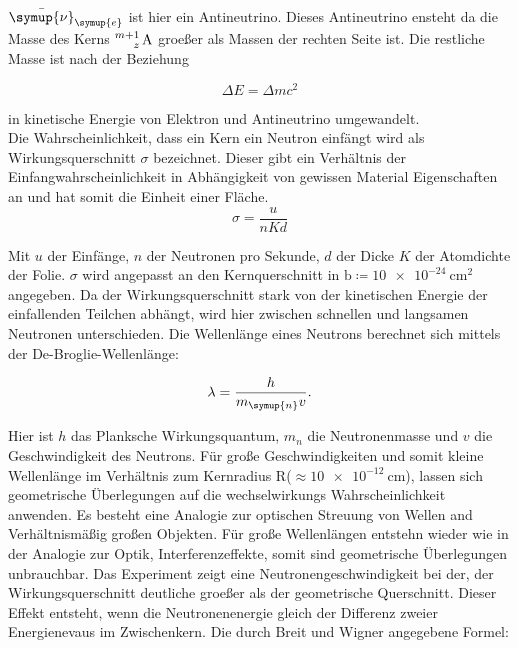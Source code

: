 \noindent $\bar{\symup{\nu}}_{\symup{e}}$ ist hier ein Antineutrino. Dieses Antineutrino ensteht da die Masse des Kerns $\ce{^{m+1}_z \text{A}}$ 
groeßer als Massen der rechten Seite ist. Die restliche Masse ist nach der Beziehung

\begin{equation}
   \Delta E = \Delta m c^2 \nonumber
\end{equation}

\noindent in kinetische Energie von Elektron und Antineutrino umgewandelt.\\
Die Wahrscheinlichkeit, dass ein Kern ein Neutron einfängt wird als Wirkungsquerschnitt $\sigma$ bezeichnet. Dieser gibt ein Verhältnis der 
Einfangwahrscheinlichkeit in Abhängigkeit von gewissen Material Eigenschaften an und hat somit die Einheit einer Fläche.
\begin{equation}
   \sigma = \frac{u}{nKd} \nonumber
\end{equation}

\noindent Mit $u$ der Einfänge, $n$ der Neutronen pro Sekunde, $d$ der Dicke $K$ der Atomdichte der Folie. $\sigma$ wird angepasst an den 
Kernquerschnitt in $\si{\barn} \coloneqq \SI{10e-24}{\centi\metre\squared}$  angegeben. Da der Wirkungsquerschnitt stark von der kinetischen Energie 
der einfallenden Teilchen abhängt, wird hier zwischen schnellen und langsamen Neutronen unterschieden. Die Wellenlänge eines Neutrons 
berechnet sich mittels der De-Broglie-Wellenlänge:

\begin{equation}
   \lambda = \frac{h}{m_{\symup{n}}v}. \nonumber
\end{equation}

\noindent Hier ist $h$ das Planksche Wirkungsquantum, $m_n$ die Neutronenmasse und $v$ die Geschwindigkeit des Neutrons. Für große Geschwindigkeiten 
und somit kleine Wellenlänge im Verhältnis zum Kernradius R($\approx \SI{10e-12}{\centi\meter}$), lassen sich geometrische Überlegungen auf die 
wechselwirkungs Wahrscheinlichkeit anwenden. Es besteht eine Analogie zur optischen Streuung von Wellen and Verhältnismäßig großen Objekten. ­Für 
große Wellenlängen entstehn wieder wie in der Analogie zur Optik, Interferenzeffekte, somit sind geometrische Überlegungen unbrauchbar. Das 
Experiment zeigt eine Neutronengeschwindigkeit bei der, der Wirkungsquerschnitt deutliche groeßer als der geometrische Querschnitt. Dieser Effekt
entsteht, wenn die Neutronenenergie gleich der Differenz zweier Energienevaus im Zwischenkern. Die durch Breit und Wigner angegebene Formel:

